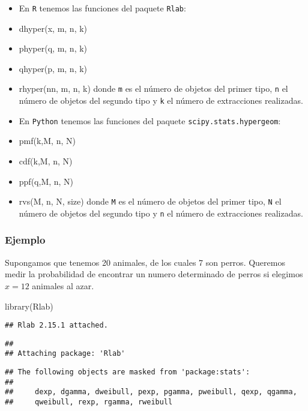 \documentclass[
]{article}
\newenvironment{Shaded}{\begin{snugshade}}{\end{snugshade}}
\newcommand{\FunctionTok}[1]{\textcolor[rgb]{0.00,0.00,0.00}{#1}}
\newcommand{\NormalTok}[1]{#1}
\begin{document}
\begin{itemize}
\item
  En \texttt{R} tenemos las funciones del paquete \texttt{Rlab}:
\item
  dhyper(x, m, n, k)
\item
  phyper(q, m, n, k)
\item
  qhyper(p, m, n, k)
\item
  rhyper(nn, m, n, k) donde \texttt{m} es el número de objetos del
  primer tipo, \texttt{n} el número de objetos del segundo tipo y
  \texttt{k} el número de extracciones realizadas.
\item
  En \texttt{Python} tenemos las funciones del paquete
  \texttt{scipy.stats.hypergeom}:
\item
  pmf(k,M, n, N)
\item
  cdf(k,M, n, N)
\item
  ppf(q,M, n, N)
\item
  rvs(M, n, N, size) donde \texttt{M} es el número de objetos del primer
  tipo, \texttt{N} el número de objetos del segundo tipo y \texttt{n} el
  número de extracciones realizadas.
\end{itemize}

\hypertarget{ejemplo}{%
\subsubsection{Ejemplo}\label{ejemplo}}

Supongamos que tenemos 20 animales, de los cuales 7 son perros. Queremos
medir la probabilidad de encontrar un numero determinado de perros si
elegimos \(x=12\) animales al azar.

\begin{Shaded}
\begin{Highlighting}[]
\FunctionTok{library}\NormalTok{(Rlab)}
\end{Highlighting}
\end{Shaded}

\begin{verbatim}
## Rlab 2.15.1 attached.
\end{verbatim}

\begin{verbatim}
## 
## Attaching package: 'Rlab'
\end{verbatim}

\begin{verbatim}
## The following objects are masked from 'package:stats':
## 
##     dexp, dgamma, dweibull, pexp, pgamma, pweibull, qexp, qgamma,
##     qweibull, rexp, rgamma, rweibull
\end{verbatim}
\end{document}
